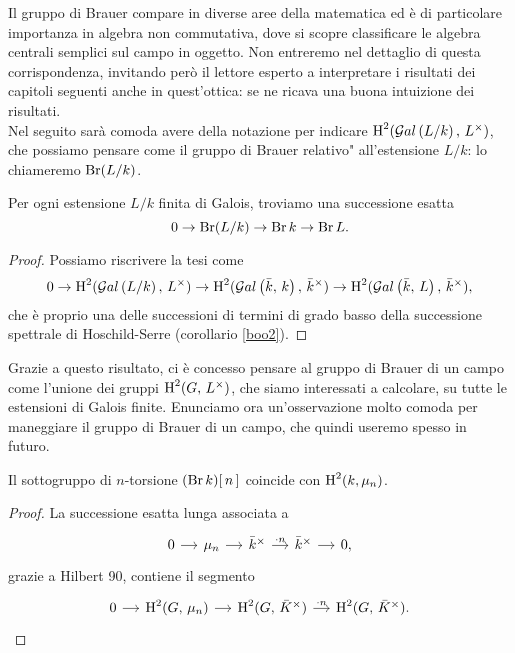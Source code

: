 Il gruppo di Brauer compare in diverse aree della matematica ed è di particolare importanza in algebra non commutativa, dove si scopre classificare le algebra centrali semplici sul campo in oggetto. Non entreremo nel dettaglio di questa corrispondenza, invitando però il lettore esperto a interpretare i risultati dei capitoli seguenti anche in quest'ottica: se ne ricava una buona intuizione dei risultati.\\

Nel seguito sarà comoda avere della notazione per indicare $ \operatorname{H}^2(\mathcal{G}al\left( L/k \right), \, L^\times) $, che possiamo pensare come il gruppo di Brauer \leftquote relativo" all'estensione $ L/k $: lo chiameremo $ \operatorname{Br}(L/k) $.

\begin{lemma}\label{stronzetto}
	Per ogni estensione $ L/k $ finita di Galois, troviamo una successione esatta
	\[ 0 \to \operatorname{Br}(L/k) \to \operatorname{Br} k \to \operatorname{Br} L.  \]
\end{lemma}
\begin{proof}
	Possiamo riscrivere la tesi come
	\[ 0 \to \operatorname{H}^2(\mathcal{G}al\left( L/k \right), \, L^\times) \to \operatorname{H}^2(\mathcal{G}al\left( \bar{k}, \, k \right), \, \bar{k}^\times) \to \operatorname{H}^2(\mathcal{G}al\left( \bar{k}, \, L \right), \, \bar{k}^\times), \]
	che è proprio una delle successioni di termini di grado basso della successione spettrale di Hoschild-Serre (corollario \ref{boo2}).
\end{proof}

Grazie a questo risultato, ci è concesso pensare al gruppo di Brauer di un campo come l'unione dei gruppi $ \operatorname{H}^2(G, \, L^\times) $, che siamo interessati a calcolare, su tutte le estensioni di Galois finite. Enunciamo ora un'osservazione molto comoda per maneggiare il gruppo di Brauer di un campo, che quindi useremo spesso in futuro.

\begin{proposition} \label{torsione del brauer}
	Il sottogruppo di $ n $-torsione $ (\operatorname{Br} k) [\,n\,] $ coincide con $ \operatorname{H}^2(k, \mu_n) $.
\end{proposition}
\begin{proof}
	La successione esatta lunga associata a 
	\[\begin{tikzcd}[column sep = small]
	0 \rar
	& \mu_n \rar
	& \bar{k}^\times \rar["\cdot n"]
	& \bar{k}^\times \rar
	& 0,
	\end{tikzcd}  \]
	grazie a Hilbert 90, contiene il segmento
	\[\begin{tikzcd}[column sep = small]
	0 \rar
	& \HH^2(G, \, \mu_n) \rar
	& \HH^2(G, \, \bar{\K}^\times) \rar["\cdot n"]
	& \HH^2(G, \, \bar{\K}^\times).
	\end{tikzcd} \qedhere \]
\end{proof}

